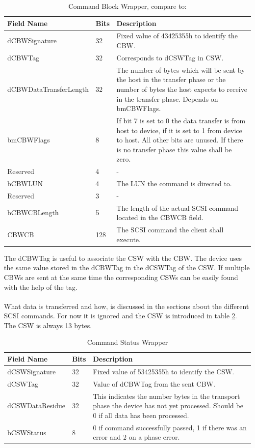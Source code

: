 \begin{table}[ht]
\caption{Command Block Wrapper, compare to: \cite{usb_ms_jan}}
\centering
\begin{tabular}{|l|l|p{9cm}|}
\hline\hline
\textbf{Field Name} & \textbf{Bits} & \textbf{Description}\\ \hline
dCBWSignature & 32 & Fixed value of 43425355h to identify the CBW. \\ \hline
dCBWTag & 32 & Corresponds to dCSWTag in CSW. \\ \hline
dCBWDataTransferLength & 32 & The number of bytes which will be sent by the host in the transfer phase or the number of bytes the host expects to receive in the transfer phase. Depends on bmCBWFlags. \\ \hline
bmCBWFlags & 8 & If bit 7 is set to 0 the data transfer is from host to device, if it is set to 1 from device to host. All other bits are unused. If there is no transfer phase this value shall be zero. \\ \hline
Reserved & 4 & - \\ \hline
bCBWLUN & 4 & The LUN the command is directed to. \\ \hline
Reserved & 3 & - \\ \hline
bCBWCBLength & 5 & The length of the actual SCSI command located in the CBWCB field. \\ \hline
CBWCB & 128 & The SCSI command the client shall execute. \\ \hline
\end{tabular}
\label{table:cbw}
\end{table}

The dCBWTag is useful to associate the CSW with the CBW. The device uses the same value stored in the dCBWTag in the dCSWTag of the CSW. If multiple CBWs are sent at the same time the corresponding CSWs can be easily found with the help of the tag.
\\\\
What data is transferred and how, is discussed in the sections about the different SCSI commands. For now it is ignored and the CSW is introduced in table \ref{table:csw}. The CSW is always 13 bytes.

\begin{table}[ht]
\caption{Command Status Wrapper \cite{usb_ms_jan}}
\centering
\begin{tabular}{|l|l|p{9cm}|}
\hline\hline
\textbf{Field Name} & \textbf{Bits} & \textbf{Description}\\ \hline
dCSWSignature & 32 & Fixed value of 53425355h to identify the CSW. \\ \hline
dCSWTag & 32 & Value of dCBWTag from the sent CBW. \\ \hline
dCSWDataResidue & 32 & This indicates the number bytes in the transport phase the device has not yet processed. Should be 0 if all data has been processed. \\ \hline
bCSWStatus & 8 & 0 if command successfully passed, 1 if there was an error and 2 on a phase error. \\ \hline
\end{tabular}
\label{table:csw}
\end{table}

